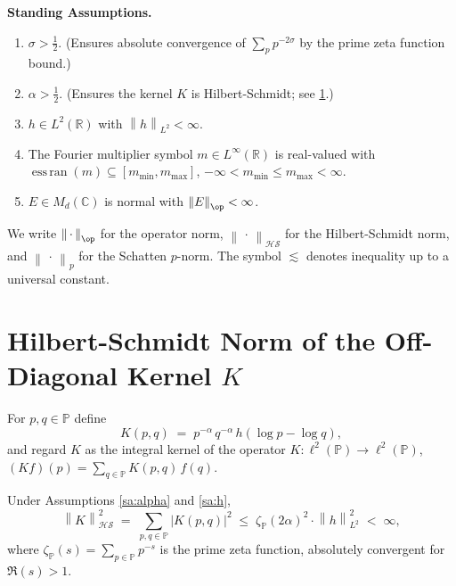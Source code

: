 \documentclass[12pt,letterpaper]{article}
\theoremstyle{definition}
\theoremstyle{remark}
\DeclareMathOperator{\essran}{ess\,ran}
\newcommand{\PP}{\mathbb{P}}
\newcommand{\RR}{\mathbb{R}}
\newcommand{\CC}{\mathbb{C}}
\newcommand{\HS}{\mathcal{HS}}
\newcommand{\norm}[1]{\left\|#1\right\|}
\newcommand{\abs}[1]{\left|#1\right|}
\newcommand{\lp}{\ell^2(\PP)}
\begin{document}
\medskip\noindent\textbf{Standing Assumptions.}
\begin{enumerate}[label=\textbf{(SA\arabic*)}]
  \item\label{sa:sigma} $\sigma > \tfrac{1}{2}$. (Ensures absolute convergence
        of $\sum_p p^{-2\sigma}$ by the prime zeta function bound.)
  \item\label{sa:alpha} $\alpha > \tfrac{1}{2}$. (Ensures the kernel $K$ is
        Hilbert-Schmidt; see \cref{app:hs}.)
  \item\label{sa:h} $h \in L^2(\RR)$ with $\norm{h}_{L^2} < \infty$.
  \item\label{sa:m} The Fourier multiplier symbol $m \in L^\infty(\RR)$ is
        real-valued with $\essran(m) \subseteq [m_{\min}, m_{\max}]$,
        $-\infty < m_{\min} \leq m_{\max} < \infty$.
  \item\label{sa:E} $E \in M_d(\CC)$ is normal with $\norm{E}_{\op} < \infty$.
\end{enumerate}

We write $\norm{\,\cdot\,}_{\op}$ for the operator norm, $\norm{\,\cdot\,}_{\HS}$
for the Hilbert-Schmidt norm, and $\norm{\,\cdot\,}_{p}$ for the Schatten
$p$-norm. The symbol $\lesssim$ denotes inequality up to a universal constant.

\section{Hilbert-Schmidt Norm of the Off-Diagonal Kernel \texorpdfstring{$K$}{K}}
\label{app:hs}

\begin{appdefn}
\label{defn:K}
For $p,q \in \PP$ define
\[
  K(p,q) \;=\; p^{-\alpha}\, q^{-\alpha}\, h\!\left(\log p - \log q\right),
\]
and regard $K$ as the integral kernel of the operator
$K \colon \lp \to \lp$, $(Kf)(p) = \sum_{q \in \PP} K(p,q)\,f(q)$.
\end{appdefn}

\begin{apptheorem}
\label{thm:hs}
Under Assumptions \ref{sa:alpha} and \ref{sa:h},
\[
  \norm{K}_{\HS}^2
  \;=\; \sum_{p,q \in \PP} \abs{K(p,q)}^2
  \;\leq\; \zeta_\PP(2\alpha)^2 \cdot \norm{h}_{L^2}^2
  \;<\; \infty,
\]
where $\zeta_\PP(s) = \sum_{p \in \PP} p^{-s}$ is the prime zeta function,
absolutely convergent for $\Re(s) > 1$.
\end{apptheorem}
\end{document}
